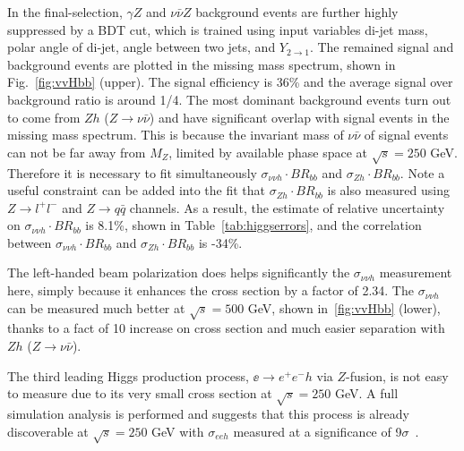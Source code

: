 In the final-selection, $\gamma Z$ and $\nu\bar{\nu}Z$ background 
events are further highly suppressed by a BDT cut, which is trained 
using input variables di-jet mass, polar angle of di-jet, angle between
two jets, and $Y_{2\to1}$. The remained signal and background events
are plotted in the missing mass spectrum, shown in Fig.~\ref{fig:vvHbb} (upper).
The signal efficiency is 36\% and the average signal over background ratio is around 1/4.
The most dominant background events turn out to come from $Zh$ ($Z\to\nu\bar{\nu}$) and 
have significant overlap with signal events in the missing mass spectrum.
This is because the invariant mass of $\nu\bar{\nu}$ of signal events
can not be far away from $M_Z$, limited by available phase space at $\sqrt{s}=250$ GeV.
Therefore it is necessary to fit simultaneously $\sigma_{\nu\nu h}\cdot BR_{bb}$
and $\sigma_{Zh}\cdot BR_{bb}$. Note a useful constraint can be added into the fit
that $\sigma_{Zh}\cdot BR_{bb}$ is also measured 
using $Z\to l^+l^-$ and $Z\to q\bar{q}$ channels. 
As a result, the estimate of relative uncertainty on $\sigma_{\nu\nu h}\cdot BR_{bb}$
is 8.1\%, shown in Table~\ref{tab:higgserrors}, 
and the correlation between $\sigma_{\nu\nu h}\cdot BR_{bb}$ and
$\sigma_{Zh}\cdot BR_{bb}$ is -34\%.

The left-handed beam polarization does helps significantly the $\sigma_{\nu\nu h}$
measurement here, simply because it enhances the cross section by a factor of 2.34.
The $\sigma_{\nu\nu h}$ can be measured much better at $\sqrt{s}=500$ GeV, 
shown in~\ref{fig:vvHbb} (lower), thanks
to a fact of 10 increase on cross section and much easier separation with $Zh$ ($Z\to\nu\bar{\nu}$).

The third leading Higgs production process, $\ee\to e^+e^- h$ via $Z$-fusion, is not easy to measure
due to its very small cross section at $\sqrt{s}=250$ GeV. 
A full simulation analysis is performed and 
suggests that this process is already discoverable at $\sqrt{s}=250$ GeV
with $\sigma_{eeh}$ measured at a significance of 9$\sigma$~\cite{}. 

